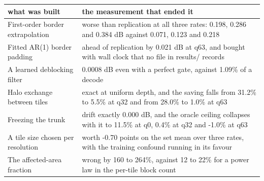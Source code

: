 \begin{tabular}{p{}p{}}
\toprule
what was built & the measurement that ended it \\
\midrule
First-order border extrapolation & worse than replication at all three rates: 0.198, 0.286 and 0.384 dB against 0.071, 0.123 and 0.218 \\
Fitted AR(1) border padding & ahead of replication by 0.021 dB at q63, and bought with wall clock that no file in results/ records \\
A learned deblocking filter & 0.0008 dB even with a perfect gate, against 1.09\% of a decode \\
Halo exchange between tiles & exact at uniform depth, and the saving falls from 31.2\% to 5.5\% at q32 and from 28.0\% to 1.0\% at q63 \\
Freezing the trunk & drift exactly 0.000 dB, and the oracle ceiling collapses with it to 11.5\% at q0, 0.4\% at q32 and -1.0\% at q63 \\
A tile size chosen per resolution & worth -0.70 points on the set mean over three rates, with the training confound running in its favour \\
The affected-area fraction & wrong by 160 to 264\%, against 12 to 22\% for a power law in the per-tile block count \\
\bottomrule
\end{tabular}

